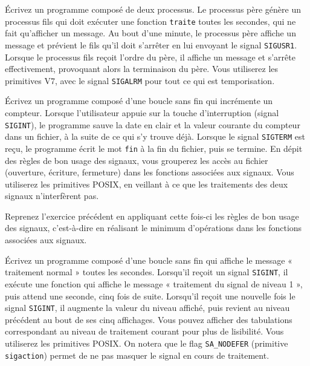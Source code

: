 \question

Écrivez un programme composé de deux processus.  Le processus père
génère un processus fils qui doit exécuter une fonction {\tt traite}
toutes les secondes, qui ne fait qu'afficher un message.  Au bout d'une
minute, le processus père affiche un message et prévient le fils qu'il
doit s'arrêter en lui envoyant le signal \texttt {SIGUSR1}. Lorsque
le processus fils reçoit l'ordre du père, il affiche un message et
s'arrête effectivement, provoquant alors la terminaison du père. Vous
utiliserez les primitives V7, avec le signal \texttt {SIGALRM} pour tout
ce qui est temporisation.


\question

Écrivez un programme composé d'une boucle sans fin qui
incrémente un compteur. Lorsque l'utilisateur appuie sur la touche
d'interruption (signal {\tt SIGINT}), le programme sauve la date en
clair et la valeur courante du compteur dans un fichier,
à la suite de ce qui s'y trouve déjà.
Lorsque le signal {\tt SIGTERM} est reçu, le programme écrit
le mot {\tt fin} à la fin du fichier, puis se termine.
En dépit des règles de bon usage des signaux, vous grouperez les accès
au fichier (ouverture, écriture, fermeture) dans les fonctions associées
aux signaux.  Vous utiliserez les primitives POSIX, en veillant à ce
que les traitements des deux signaux n'interfèrent pas.

\clearpage


\question

Reprenez l'exercice précédent en appliquant cette fois-ci les règles
de bon usage des signaux, c'est-à-dire en réalisant le minimum
d'opérations dans les fonctions associées aux signaux.


\question

Écrivez un programme composé d'une boucle sans fin qui affiche le
message « traitement normal » toutes les secondes. Lorsqu'il reçoit un
signal {\tt SIGINT}, il exécute une fonction qui affiche le message
« traitement du signal de niveau 1 », puis attend une seconde, cinq
fois de suite. Lorsqu'il reçoit une nouvelle fois le signal \texttt
{SIGINT}, il augmente la valeur du niveau affiché, puis revient au
niveau précédent au bout de ses cinq affichages. Vous pouvez afficher
des tabulations correspondant au niveau de traitement courant pour plus
de lisibilité. Vous utiliserez les primitives POSIX. On notera que le
flag \texttt {SA\_NODEFER} (primitive \texttt {sigaction}) permet de ne
pas masquer le signal en cours de traitement.


